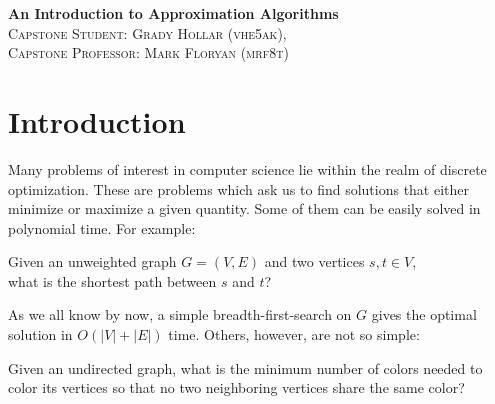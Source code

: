\documentclass{article}
\newenvironment{envsection}[1]{\begin{trivlist}
\item[\hskip \labelsep {\bfseries #1}]}{\end{trivlist}}
\begin{document}
\setlength{\abovedisplayskip}{4pt}
\setlength{\belowdisplayskip}{4pt}

\pagestyle{fancy}
\fancyhead{}

\begin{center}
    \Large
    {\textbf{An Introduction to Approximation Algorithms}}\\
    \vspace{3pt}
    \normalsize 
    \textsc{Capstone Student: Grady Hollar (vhe5ak),}\\
    \textsc{Capstone Professor: Mark Floryan (mrf8t)}
\end{center}



\section{Introduction}

\noindent Many problems of interest in computer science lie within the realm of discrete optimization. These are problems which ask us to find solutions that either minimize or maximize a given quantity. Some of them can be easily solved in polynomial time. For example:
\begin{center}
    Given an unweighted graph $G = (V,E)$ and two vertices $s,t \in V$,\\
    what is the shortest path between $s$ and $t$?
\end{center}

\noindent As we all know by now, a simple breadth-first-search on $G$ gives the optimal solution in $O(|V| + |E|)$ time. Others, however, are not so simple:
\begin{center}
    Given an undirected graph, what is the minimum number of colors needed to\\ color its vertices so that no two neighboring vertices share the same color? 

\end{center}
\end{document}

